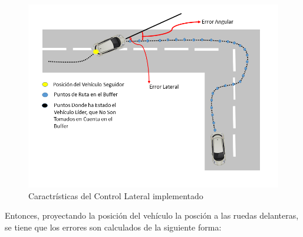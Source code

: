 \begin{figure}[!h]
	\centering
		\includegraphics[scale=0.40]{Imagenes/cle}
		\caption{Caractrísticas del Control Lateral implementado}
		\label{fig:cle}
	\end{figure}	 

Entonces, proyectando la posición del vehículo la posción a las ruedas delanteras, se tiene que los errores son calculados de la siguiente forma:

